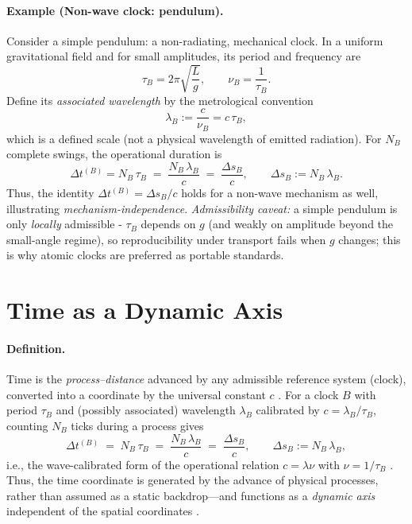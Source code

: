 \documentclass[12pt]{article}
\begin{document}
\paragraph{Example (Non-wave clock: pendulum).}
Consider a simple pendulum: a non-radiating, mechanical clock. In a uniform gravitational
field and for small amplitudes, its period and frequency are
\[
\tau_B = 2\pi\sqrt{\frac{L}{g}}, 
\qquad 
\nu_B = \frac{1}{\tau_B}.
\]
Define its \emph{associated wavelength} by the metrological convention
\[
\lambda_B := \frac{c}{\nu_B} = c\,\tau_B,
\]
which is a defined scale (not a physical wavelength of emitted radiation). For \(N_B\) complete swings, the operational duration is
\[
\Delta t^{(B)} = N_B\,\tau_B
\;=\; \frac{N_B\,\lambda_B}{c}
\;=\; \frac{\Delta s_B}{c},
\qquad
\Delta s_B := N_B\,\lambda_B.
\]
Thus, the identity \(\Delta t^{(B)}=\Delta s_B/c\) holds for a non-wave mechanism as well,
illustrating \emph{mechanism-independence}. \emph{Admissibility caveat:} a simple pendulum
is only \emph{locally} admissible - \(\tau_B\) depends on \(g\) (and weakly on amplitude beyond
the small-angle regime), so reproducibility under transport fails when \(g\) changes; this is
why atomic clocks are preferred as portable standards.

\newpage

\section{Time as a Dynamic Axis}

\paragraph{Definition.}
Time is the \emph{process–distance} advanced by any admissible reference system (clock), converted into a coordinate by the universal constant \(c\) \cite{BerziGorini1969,LevyLeblond1976,Mermin1984}. For a clock \(B\) with period \(\tau_B\) and (possibly associated) wavelength \(\lambda_B\) calibrated by \(c=\lambda_B/\tau_B\), counting \(N_B\) ticks during a process gives
\begin{equation}
    \Delta t^{(B)} \;=\; N_B\,\tau_B \;=\; \frac{N_B\,\lambda_B}{c}
    \;=\; \frac{\Delta s_B}{c}, \qquad \Delta s_B := N_B\,\lambda_B,
\end{equation}
i.e., the wave-calibrated form of the operational relation \(c=\lambda\nu\) with \(\nu=1/\tau_B\) \cite{HechtOptics}. Thus, the time coordinate is generated by the advance of physical processes, rather than assumed as a static backdrop—and functions as a \emph{dynamic axis} independent of the spatial coordinates \cite{Einstein1905}.
\end{document}
